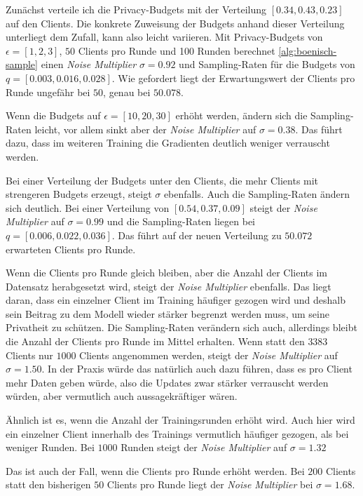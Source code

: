 Zunächst verteile ich die Privacy-Budgets mit der Verteilung $[0.34, 0.43, 0.23]$ auf den Clients. Die konkrete Zuweisung der Budgets anhand dieser Verteilung unterliegt dem Zufall, kann also leicht variieren. Mit Privacy-Budgets von $\epsilon = [1,2,3]$, $50$ Clients pro Runde und 100 Runden berechnet \autoref{alg:boenisch-sample} einen \textit{Noise Multiplier} $\sigma = 0.92$ und Sampling-Raten für die Budgets von $q = [0.003, 0.016, 0.028]$. Wie gefordert liegt der Erwartungswert der Clients pro Runde ungefähr bei $50$, genau bei $50.078$.

Wenn die Budgets auf $\epsilon = [10, 20, 30]$ erhöht werden, ändern sich die Sampling-Raten leicht, vor allem sinkt aber der \textit{Noise Multiplier} auf $\sigma = 0.38$. Das führt dazu, dass im weiteren Training die Gradienten deutlich weniger verrauscht werden.

Bei einer Verteilung der Budgets unter den Clients, die mehr Clients mit strengeren Budgets erzeugt, steigt $\sigma$ ebenfalls. Auch die Sampling-Raten ändern sich deutlich. Bei einer Verteilung von $[0.54, 0.37, 0.09]$ steigt der \textit{Noise Multiplier} auf $\sigma = 0.99$ und die Sampling-Raten liegen bei $q = [0.006, 0.022, 0.036]$. Das führt auf der neuen Verteilung zu $50.072$ erwarteten Clients pro Runde.

Wenn die Clients pro Runde gleich bleiben, aber die Anzahl der Clients im Datensatz herabgesetzt wird, steigt der \textit{Noise Multiplier} ebenfalls. Das liegt daran, dass ein einzelner Client im Training häufiger gezogen wird und deshalb sein Beitrag zu dem Modell wieder stärker begrenzt werden muss, um seine Privatheit zu schützen. Die Sampling-Raten verändern sich auch, allerdings bleibt die Anzahl der Clients pro Runde im Mittel erhalten. Wenn statt den $3383$ Clients nur $1000$ Clients angenommen werden, steigt der \textit{Noise Multiplier} auf $\sigma = 1.50$. In der Praxis würde das natürlich auch dazu führen, dass es pro Client mehr Daten geben würde, also die Updates zwar stärker verrauscht werden würden, aber vermutlich auch aussagekräftiger wären.

Ähnlich ist es, wenn die Anzahl der Trainingsrunden erhöht wird. Auch hier wird ein einzelner Client innerhalb des Trainings vermutlich häufiger gezogen, als bei weniger Runden. Bei $1000$ Runden steigt der \textit{Noise Multiplier} auf $\sigma = 1.32$

Das ist auch der Fall, wenn die Clients pro Runde erhöht werden. Bei $200$ Clients statt den bisherigen $50$ Clients pro Runde liegt der \textit{Noise Multiplier} bei $\sigma = 1.68$.

